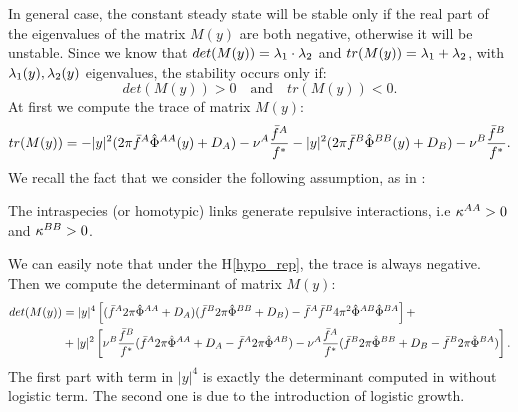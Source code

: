 In general case, the constant steady state will be stable only if the real part of the eigenvalues of the matrix $M(y)$ are both negative, otherwise it will be unstable. Since we know that $det(M(y))={\lambda}_1 \cdot {\lambda}_2$ and $tr(M(y))={\lambda}_1+{\lambda}_2$, with ${\lambda}_1(y), {\lambda}_2(y)$ eigenvalues, the stability occurs only if:
\[det(M(y))>0\quad \text{and} \quad tr(M(y))<0. \]
At first we compute the trace of matrix $M(y)$:
\begin{equation}
 tr(M(y))=-|y|^2(2\pi{\bar{f}^A}{\hat{\Phi}^{AA}}(y)+D_A)-{\nu^A}\frac{{\bar{f}^A}}{{f^{*}}}-|y|^2(2\pi{\bar{f}^B}{\hat{\Phi}^{BB}}(y)+D_B)-{\nu^B}\frac{{\bar{f}^B}}{{f^{*}}}.
\end{equation}
We recall the fact that we consider the following assumption, as in \cite{twoparticule}:
\begin{hypo}\label{hypo_rep}
 The intraspecies (or homotypic) links generate repulsive interactions, i.e ${\kappa^{AA}}>0$ and ${\kappa^{BB}}>0$.
\end{hypo}
We can easily note that under the H\ref{hypo_rep}, the trace is always negative.
Then we compute the determinant of matrix $M(y)$:
\begin{equation}
\begin{split}
det(M(y))&= |y|^4 \left[ ({\bar{f}^A} 2\pi {\hat{\Phi}^{AA}} +D_A)({\bar{f}^B} 2\pi {\hat{\Phi}^{BB}} +D_B) - {\bar{f}^A} {\bar{f}^B} 4 \pi^2 {\hat{\Phi}^{AB}} {\hat{\Phi}^{BA}} \right] + \\
&+|y|^2 \left[ {\nu^B} \frac{{\bar{f}^B}}{{f^{*}}}({\bar{f}^A} 2\pi {\hat{\Phi}^{AA}} + D_A -{\bar{f}^A} 2\pi {\hat{\Phi}^{AB}}) - {\nu^A} \frac{{\bar{f}^A}}{{f^{*}}}({\bar{f}^B} 2\pi {\hat{\Phi}^{BB}} + D_B -{\bar{f}^B} 2\pi {\hat{\Phi}^{BA}})   \right].
\end{split}
\end{equation}
The first part with term in $|y|^4$ is exactly the determinant computed in \cite{twoparticule} without logistic term. The second one is due to the introduction of logistic growth. \\
